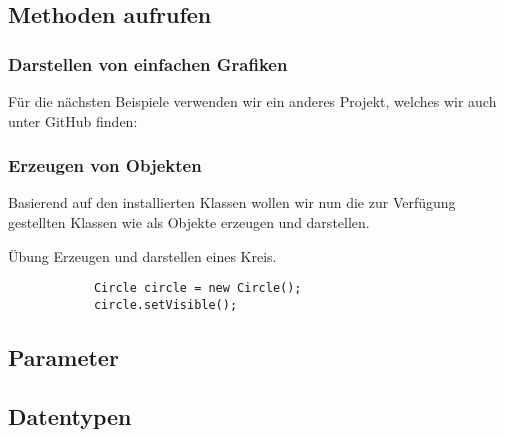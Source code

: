 \mode*
{}


\subsection{Methoden aufrufen}
\label{subsec:call-method}

\begin{frame}[fragile]
    \frametitle<presentation>{Darstellen von einfachen Grafiken}
    Für die nächsten Beispiele verwenden wir ein anderes Projekt, welches wir
    auch unter GitHub finden: 


\end{frame}

\begin{frame}[fragile]
    \frametitle<presentation>{Erzeugen von Objekten}
    Basierend auf den installierten Klassen wollen wir nun die zur Verfügung
    gestellten Klassen wie als Objekte erzeugen und
    darstellen.

    \begin{block}{Übung}
        Erzeugen und darstellen eines Kreis.
        \begin{verbatim}
            Circle circle = new Circle();
            circle.setVisible();
        \end{verbatim}
    \end{block}
\end{frame}

\subsection{Parameter}
\label{subsec:parameter}


\subsection{Datentypen}
\label{subsec:datatypes}


